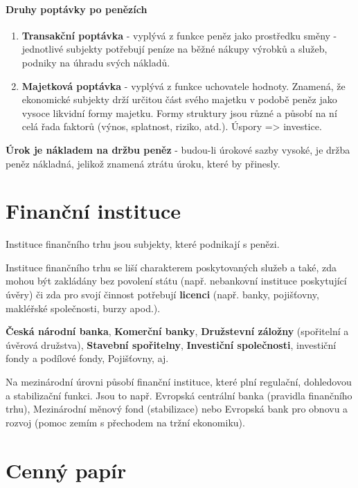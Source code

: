 \paragraph{Druhy poptávky po penězích}
\begin{enumerate}   
    \item \textbf{Transakční poptávka} - vyplývá z funkce peněz jako prostředku směny - jednotlivé subjekty potřebují peníze na běžné nákupy výrobků a služeb, podniky na úhradu svých nákladů.
    \item \textbf{Majetková poptávka} - vyplývá z funkce uchovatele hodnoty. Znamená, že ekonomické subjekty drží určitou část svého majetku v podobě peněz jako vysoce likvidní formy majetku. Formy struktury jsou různé a působí na ní celá řada faktorů (výnos, splatnost, riziko, atd.). Úspory => investice.
\end{enumerate}

\textbf{Úrok je nákladem na držbu peněz} - budou-li úrokové sazby vysoké, je držba peněz nákladná, jelikož znamená ztrátu úroku, které by přinesly.

\section*{Finanční instituce}

Instituce finančního trhu jsou subjekty, které podnikají s penězi.

Instituce finančního trhu se liší charakterem poskytovaných služeb a také, zda mohou být zakládány bez povolení státu (např. nebankovní instituce poskytující úvěry) či zda pro svojí činnost potřebují \textbf{licenci} (např. banky, pojišťovny, makléřské společnosti, burzy apod.).

\textbf{Česká národní banka}, \textbf{Komerční banky}, \textbf{Družstevní záložny} (spořitelní a úvěrová družstva), \textbf{Stavební spořitelny}, \textbf{Investiční společnosti}, investiční fondy a podílové fondy, Pojišťovny, aj.

Na mezinárodní úrovni působí finanční instituce, které plní regulační, dohledovou a stabilizační funkci. Jsou to např. Evropská centrální banka (pravidla finančního trhu), Mezinárodní měnový fond (stabilizace) nebo Evropská bank pro obnovu a rozvoj (pomoc zemím s přechodem na tržní ekonomiku).

\section*{Cenný papír}

